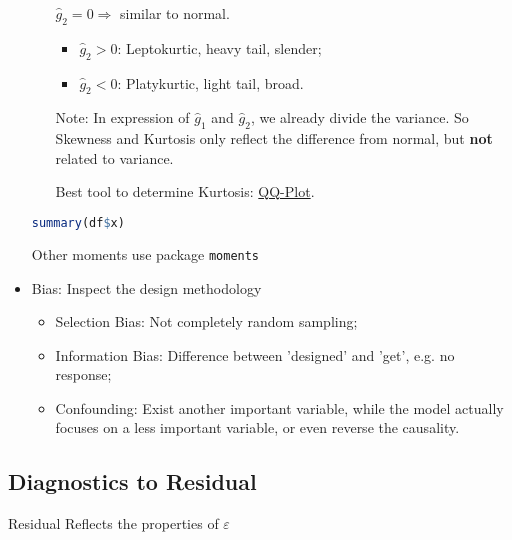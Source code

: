 \begin{itemize}[topsep=2pt,itemsep=2pt]
\begin{itemize}[topsep=2pt,itemsep=2pt]
            $ \hat{g}_2=0 \Rightarrow $ similar to normal.
            \begin{itemize}[topsep=2pt,itemsep=2pt]
                \item $ \hat{g}_2>0 $: Leptokurtic, heavy tail, slender;
                \item $ \hat{g}_2<0 $: Platykurtic, light tail, broad.
            \end{itemize}
            
            Note: In expression of $ \hat{g}_1 $ and $ \hat{g}_2 $, we already divide the variance. So Skewness and Kurtosis only reflect the difference from normal, but \textbf{not}  related to variance.
                
            Best tool to determine Kurtosis: \hyperlink{QQplot}{QQ-Plot}.
            
        \end{itemize}

\begin{rcode}
\begin{lstlisting}[language=R]
summary(df$x)
\end{lstlisting}

    Other moments use package \lstinline|moments|
\end{rcode}
        
    
        \item Bias: Inspect the design methodology
        \begin{itemize}[topsep=2pt,itemsep=2pt]
            \item Selection Bias: Not completely random sampling;
            \item Information Bias: Difference between 'designed' and 'get', e.g. no response;
            \item Confounding: Exist another important variable, while the model actually focuses on a less important variable, or even reverse the causality.
        \end{itemize}
        
            
\end{itemize}
    
\subsection{Diagnostics to Residual}\label{SubSecDiagnostics}

\begin{point}
    Residual Reflects the properties of $ \varepsilon  $
\end{point}


